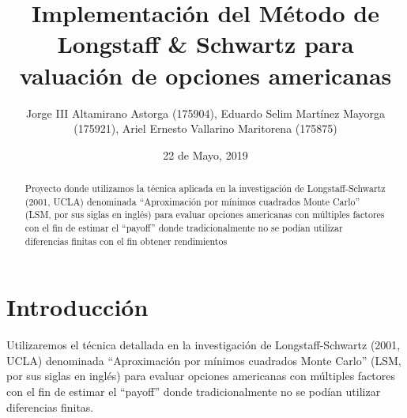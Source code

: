 \documentclass[12pt,reqno,letter]{article}
\begin{document}
	\title{ Implementación del Método de Longstaff \& Schwartz para valuación de opciones americanas }
	\author{Jorge III Altamirano Astorga (175904), Eduardo Selim Martínez Mayorga (175921), Ariel Ernesto Vallarino Maritorena (175875)}
	\date{22 de Mayo, 2019}
	\maketitle
	
	\begin{abstract}
		Proyecto donde utilizamos la técnica aplicada en la investigación de Longstaff-Schwartz (2001, UCLA) denominada  “Aproximación por mínimos cuadrados Monte Carlo” (LSM, por sus siglas en inglés) para evaluar opciones americanas con múltiples factores con el fin de estimar el “payoff” donde tradicionalmente no se podían utilizar diferencias finitas con el fin obtener rendimientos
	\end{abstract}

	\tableofcontents

	

	\section{Introducción}
	Utilizaremos el técnica detallada en la investigación de Longstaff-Schwartz (2001, UCLA) denominada  “Aproximación por mínimos cuadrados Monte Carlo” (LSM, por sus siglas en inglés) para evaluar opciones americanas con múltiples factores con el fin de estimar el “payoff” donde tradicionalmente no se podían utilizar diferencias finitas.
	
\end{document}
